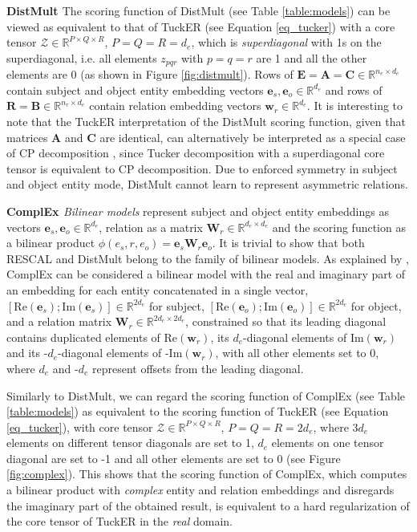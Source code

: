 \documentclass[11pt,a4paper]{article}
\newcommand{\keypoint}[1]{\vspace{0.1cm}\noindent\textbf{#1}\quad}
\begin{document}
\keypoint{DistMult \cite{yang2014embedding}} The scoring function of DistMult (see Table \ref{table:models}) can be viewed as  equivalent to that of TuckER (see Equation \ref{eq_tucker}) with a core tensor $\mathcal{Z} \in \mathbb{R}^{P \times Q \times R}$, $P = Q = R = d_e$, which is \textit{superdiagonal} with 1s on the superdiagonal, i.e. all elements $z_{pqr}$ with $p=q=r$ are 1 and all the other elements are 0 (as shown in Figure \ref{fig:distmult}). Rows of $\mathbf{E} = \mathbf{A} = \mathbf{C} \in \mathbb{R}^{n_e \times d_e}$ contain subject and object entity embedding vectors $\mathbf{e}_s, \mathbf{e}_o \in \mathbb{R}^{d_e}$ and rows of $\mathbf{R} = \mathbf{B} \in \mathbb{R}^{n_r \times d_e}$ contain relation embedding vectors $\mathbf{w}_r \in \mathbb{R}^{d_e}$. It is interesting to note that the TuckER interpretation of the DistMult scoring function, given that matrices $\mathbf{A}$ and $\mathbf{C}$ are identical, can alternatively be interpreted as a special case of CP decomposition \cite{hitchcock1927expression}, since Tucker decomposition with a superdiagonal core tensor is equivalent to CP decomposition. Due to enforced symmetry in subject and object entity mode, DistMult cannot learn to represent asymmetric relations.

\keypoint{ComplEx \cite{trouillon2016complex}} \textit{Bilinear models} represent subject and object entity embeddings as vectors $\mathbf{e}_s, \mathbf{e}_o \in \mathbb{R}^{d_e}$, relation as a matrix $\mathbf{W}_r \in \mathbb{R}^{d_e \times d_e}$ and the scoring function as a bilinear product $\phi(e_s, r, e_o) = \mathbf{e}_s\mathbf{W}_r\mathbf{e}_o$. It is trivial to show that both RESCAL and DistMult belong to the family of bilinear models. As explained by \citet{kazemi2018simple}, ComplEx can be considered a bilinear model with the real and imaginary part of an embedding for each entity concatenated in a single vector, $[\text{Re}(\mathbf{e}_s); \text{Im}(\mathbf{e}_s)] \in \mathbb{R}^{2d_e}$ for subject, $[\text{Re}(\mathbf{e}_o); \text{Im}(\mathbf{e}_o)] \in \mathbb{R}^{2d_e}$ for object, and a relation matrix $\mathbf{W}_r \in \mathbb{R}^{2d_e \times 2d_e}$, constrained so that its leading diagonal contains duplicated elements of $\text{Re}(\mathbf{w}_r)$, its $d_e$-diagonal elements of $\text{Im}(\mathbf{w}_r)$ and its -$d_e$-diagonal elements of -$\text{Im}(\mathbf{w}_r)$, with all other elements set to 0, where $d_e$ and -$d_e$ represent offsets from the leading diagonal. 

Similarly to DistMult, we can regard the scoring function of ComplEx (see Table \ref{table:models}) as equivalent to the scoring function of TuckER (see Equation \ref{eq_tucker}), with core tensor $\mathcal{Z} \in \mathbb{R}^{P \times Q \times R}$, $P=Q=R=2d_e$, where $3d_e$ elements on different tensor diagonals are set to 1, $d_e$ elements on one tensor diagonal are set to -1 and all other elements are set to 0 (see Figure \ref{fig:complex}). This shows that the scoring function of ComplEx, which computes a bilinear product with \textit{complex} entity and relation embeddings and disregards the imaginary part of the obtained result, is equivalent to a hard regularization of the core tensor of TuckER in the \textit{real} domain.  
\end{document}
